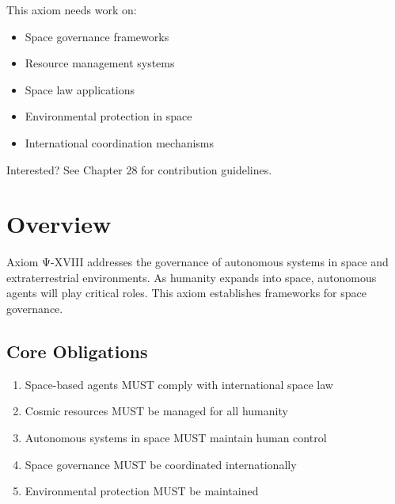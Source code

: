\begin{tcolorbox}[colback=lightgray, colframe=accentgold, title=\textbf{🎯 Contribution Opportunity}]
This axiom needs work on:
\begin{itemize}
    \item Space governance frameworks
    \item Resource management systems
    \item Space law applications
    \item Environmental protection in space
    \item International coordination mechanisms
\end{itemize}

Interested? See Chapter 28 for contribution guidelines.
\end{tcolorbox}

\vspace{0.5cm}

\section{Overview}

Axiom Ψ-XVIII addresses the governance of autonomous systems in space and extraterrestrial environments. As humanity expands into space, autonomous agents will play critical roles. This axiom establishes frameworks for space governance.

\subsection{Core Obligations}

\begin{enumerate}
    \item Space-based agents MUST comply with international space law
    \item Cosmic resources MUST be managed for all humanity
    \item Autonomous systems in space MUST maintain human control
    \item Space governance MUST be coordinated internationally
    \item Environmental protection MUST be maintained
\end{enumerate}

\vspace{0.5cm}

